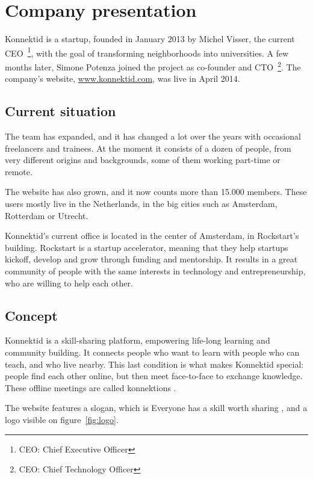 \section{Company presentation}
\label{sec:company}

Konnektid is a startup, founded in January 2013 by Michel {\sc Visser}, the current CEO~\footnote{CEO: Chief Executive Officer},
with the goal of transforming neighborhoods into universities. A few months later, Simone {\sc Potenza} joined the project
as co-founder and CTO~\footnote{CEO: Chief Technology Officer}. The company's website, \url{www.konnektid.com}, was live in April 2014.

\subsection{Current situation}
\label{ssec:situation}

The team has expanded, and it has changed a lot over the years with occasional freelancers and trainees.
At the moment it consists of a dozen of people, from very different origins and backgrounds, some of them working part-time or remote.

The website has also grown, and it now counts more than 15.000 members.
These users mostly live in the Netherlands, in the big cities such as Amsterdam, Rotterdam or Utrecht.

Konnektid's current office is located in the center of Amsterdam, in Rockstart's building.
Rockstart is a startup accelerator, meaning that they help startups kickoff, develop and grow through funding and mentorship.
It results in a great community of people with the same interests in technology and entrepreneurship, who are willing to help each other.

\subsection{Concept}
\label{ssec:concept}

Konnektid is a skill-sharing platform, empowering life-long learning and community building. It connects people who want to learn with people who can teach, and who live nearby.
This last condition is what makes Konnektid special: people find each other online, but then meet face-to-face to exchange knowledge.
These offline meetings are called \guillemotleft{} konnektions \guillemotright{}.

The website features a slogan, which is \guillemotleft{} Everyone has a skill worth sharing \guillemotright{},
and a logo visible on {\sc figure}~\ref{fig:logo}.
\vspace{1cm}

